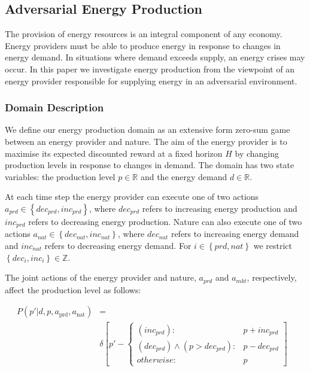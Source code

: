 \subsection{Adversarial Energy Production}

The provision of energy resources is an integral component of any
economy. Energy providers must be able to produce energy in response
to changes in energy demand. In situations where demand exceeds supply,
an energy crises may occur. In this paper we investigate energy 
production from the viewpoint of an energy provider responsible for 
supplying energy in an adversarial environment.

\subsubsection{Domain Description}

We define our energy production domain as an extensive form zero-sum
game between an energy provider and nature. The aim of the energy
provider is to maximise its expected discounted reward at a 
fixed horizon $H$ by changing production levels in response to changes in demand.
The domain has two state variables: the production level $p \in \mathbb{R}$ and the energy demand
$d \in \mathbb{R}$. 

At each time step the energy provider can execute one of two actions
$a_{prd} \in \left\{dec_{prd}, inc_{prd}\right\}$, where $dec_{prd}$ 
refers to increasing energy production and $inc_{prd}$ refers to decreasing
energy production. Nature can also execute one of two actions
$a_{nat} \in \left\{dec_{nat}, inc_{nat}\right\}$, where $dec_{nat}$ 
refers to increasing energy demand and $inc_{nat}$ refers to decreasing
energy demand. For $i \in \left\{prd, nat\right\}$ we restrict 
$\left\{dec_i, inc_i\right\} \in \mathbb{Z}$.

The joint actions of the energy provider and nature, $a_{prd}$ and
$a_{mkt}$, respectively, affect the production level as follows:

{\tiny 
\begin{align*}
P(p' | d, p, a_{\text{prd}}, a_{\text{nat}}) &= \\
&
\delta \left[ p' - \begin{cases}
      (inc_{prd})  : & p + inc_{prd} \\
       (dec_{prd}) \wedge (p > dec_{prd}): & p - dec_{prd} \\
      otherwise: & p
    \end{cases} \right] & \\    
\end{align*}
}%

